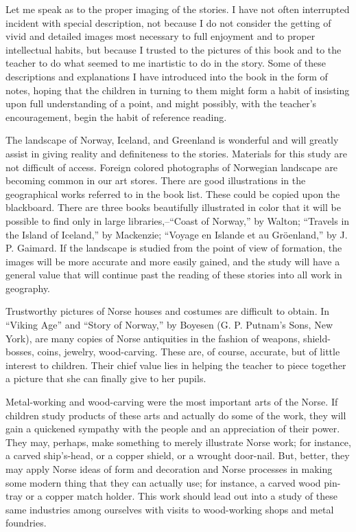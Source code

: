 Let me speak as to the proper imaging of the stories. I have not often
interrupted incident with special description, not because I do not
consider the getting of vivid and detailed images most necessary to full
enjoyment and to proper intellectual habits, but because I trusted to
the pictures of this book and to the teacher to do what seemed to me
inartistic to do in the story. Some of these descriptions and
explanations I have introduced into the book in the form of notes,
hoping that the children in turning to them might form a habit of
insisting upon full understanding of a point, and might possibly, with
the teacher's encouragement, begin the habit of reference reading.

The landscape of Norway, Iceland, and Greenland is wonderful and will
greatly assist in giving reality and definiteness to the stories.
Materials for this study are not difficult of access. Foreign colored
photographs of Norwegian landscape are becoming common in our art
stores. There are good illustrations in the geographical works referred
to in the book list. These could be copied upon the blackboard. There
are three books beautifully illustrated in color that it will be
possible to find only in large libraries,--``Coast of Norway,'' by
Walton; ``Travels in the Island of Iceland,'' by Mackenzie; ``Voyage en
Islande et au Gröenland,'' by J. P. Gaimard. If the landscape is studied
from the point of view of formation, the images will be more accurate
and more easily gained, and the study will have a general value that
will continue past the reading of these stories into all work in
geography.

Trustworthy pictures of Norse houses and costumes are difficult to
obtain. In ``Viking Age'' and ``Story of Norway,'' by Boyesen (G. P.
Putnam's Sons, New York), are many copies of Norse antiquities in the
fashion of weapons, shield-bosses, coins, jewelry, wood-carving. These
are, of course, accurate, but of little interest to children. Their
chief value lies in helping the teacher to piece together a picture that
she can finally give to her pupils.

Metal-working and wood-carving were the most important arts of the
Norse. If children study products of these arts and actually do some of
the work, they will gain a quickened sympathy with the people and an
appreciation of their power. They may, perhaps, make something to merely
illustrate Norse work; for instance, a carved ship's-head, or a copper
shield, or a wrought door-nail. But, better, they may apply Norse ideas
of form and decoration and Norse processes in making some modern thing
that they can actually use; for instance, a carved wood pin-tray or a
copper match holder. This work should lead out into a study of these
same industries among ourselves with visits to wood-working shops and
metal foundries.

